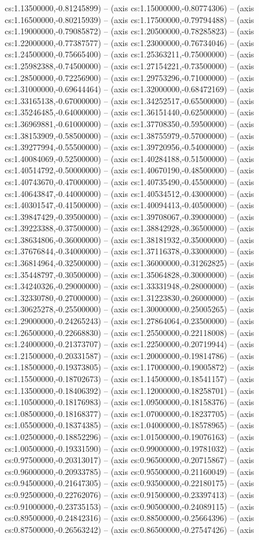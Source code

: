 cs:1.13500000,-0.81245899) -- (axis cs:1.15000000,-0.80774306) -- (axis cs:1.16500000,-0.80215939) -- (axis cs:1.17500000,-0.79794488) -- (axis cs:1.19000000,-0.79085872) -- (axis cs:1.20500000,-0.78285823) -- (axis cs:1.22000000,-0.77387577) -- (axis cs:1.23000000,-0.76734046) -- (axis cs:1.24500000,-0.75665400) -- (axis cs:1.25363211,-0.75000000) -- (axis cs:1.25982388,-0.74500000) -- (axis cs:1.27154221,-0.73500000) -- (axis cs:1.28500000,-0.72256900) -- (axis cs:1.29753296,-0.71000000) -- (axis cs:1.31000000,-0.69644464) -- (axis cs:1.32000000,-0.68472169) -- (axis cs:1.33165138,-0.67000000) -- (axis cs:1.34252517,-0.65500000) -- (axis cs:1.35246485,-0.64000000) -- (axis cs:1.36151440,-0.62500000) -- (axis cs:1.36969881,-0.61000000) -- (axis cs:1.37708350,-0.59500000) -- (axis cs:1.38153909,-0.58500000) -- (axis cs:1.38755979,-0.57000000) -- (axis cs:1.39277994,-0.55500000) -- (axis cs:1.39720956,-0.54000000) -- (axis cs:1.40084069,-0.52500000) -- (axis cs:1.40284188,-0.51500000) -- (axis cs:1.40514792,-0.50000000) -- (axis cs:1.40670190,-0.48500000) -- (axis cs:1.40743670,-0.47000000) -- (axis cs:1.40735490,-0.45500000) -- (axis cs:1.40643847,-0.44000000) -- (axis cs:1.40534512,-0.43000000) -- (axis cs:1.40301547,-0.41500000) -- (axis cs:1.40094413,-0.40500000) -- (axis cs:1.39847429,-0.39500000) -- (axis cs:1.39708067,-0.39000000) -- (axis cs:1.39223388,-0.37500000) -- (axis cs:1.38842928,-0.36500000) -- (axis cs:1.38634806,-0.36000000) -- (axis cs:1.38181932,-0.35000000) -- (axis cs:1.37676844,-0.34000000) -- (axis cs:1.37116378,-0.33000000) -- (axis cs:1.36814964,-0.32500000) -- (axis cs:1.36000000,-0.31262825) -- (axis cs:1.35448797,-0.30500000) -- (axis cs:1.35064828,-0.30000000) -- (axis cs:1.34240326,-0.29000000) -- (axis cs:1.33331948,-0.28000000) -- (axis cs:1.32330780,-0.27000000) -- (axis cs:1.31223830,-0.26000000) -- (axis cs:1.30625278,-0.25500000) -- (axis cs:1.30000000,-0.25005265) -- (axis cs:1.29000000,-0.24265243) -- (axis cs:1.27864064,-0.23500000) -- (axis cs:1.26500000,-0.22668830) -- (axis cs:1.25500000,-0.22118008) -- (axis cs:1.24000000,-0.21373707) -- (axis cs:1.22500000,-0.20719944) -- (axis cs:1.21500000,-0.20331587) -- (axis cs:1.20000000,-0.19814786) -- (axis cs:1.18500000,-0.19373805) -- (axis cs:1.17000000,-0.19005872) -- (axis cs:1.15500000,-0.18702673) -- (axis cs:1.14500000,-0.18541157) -- (axis cs:1.13500000,-0.18406392) -- (axis cs:1.12000000,-0.18258701) -- (axis cs:1.10500000,-0.18176983) -- (axis cs:1.09500000,-0.18158376) -- (axis cs:1.08500000,-0.18168377) -- (axis cs:1.07000000,-0.18237705) -- (axis cs:1.05500000,-0.18374385) -- (axis cs:1.04000000,-0.18578965) -- (axis cs:1.02500000,-0.18852296) -- (axis cs:1.01500000,-0.19076163) -- (axis cs:1.00500000,-0.19331590) -- (axis cs:0.99000000,-0.19781032) -- (axis cs:0.97500000,-0.20313017) -- (axis cs:0.96500000,-0.20715867) -- (axis cs:0.96000000,-0.20933785) -- (axis cs:0.95500000,-0.21160049) -- (axis cs:0.94500000,-0.21647305) -- (axis cs:0.93500000,-0.22180175) -- (axis cs:0.92500000,-0.22762076) -- (axis cs:0.91500000,-0.23397413) -- (axis cs:0.91000000,-0.23735153) -- (axis cs:0.90500000,-0.24089115) -- (axis cs:0.89500000,-0.24842316) -- (axis cs:0.88500000,-0.25664396) -- (axis cs:0.87500000,-0.26563242) -- (axis cs:0.86500000,-0.27547426) -- (axis 